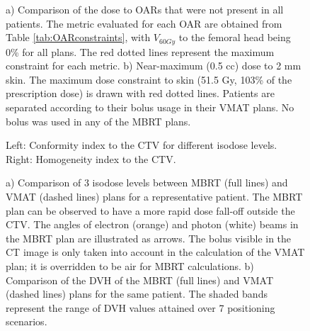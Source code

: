 \documentclass[aapm,graphicx,superscriptaddress]{revtex4-1}
\begin{document}
\begin{figure}[htb]
    \centering
    \subfloat[\label{fig:oar}]{
    
    }
    \subfloat[\label{fig:skin}]{
    
    }
    \caption{a) Comparison of the dose to OARs that were not present in all patients. The metric evaluated for each OAR are obtained from Table \ref{tab:OARconstraints}, with $V_{60Gy}$ to the femoral head being 0\% for all plans. The red dotted lines represent the maximum constraint for each metric. b) Near-maximum (0.5 cc) dose to 2 mm skin. The maximum dose constraint to skin (51.5 Gy, 103\% of the prescription dose) is drawn with red dotted lines. Patients are separated according to their bolus usage in their VMAT plans. No bolus was used in any of the MBRT plans.}
\end{figure}
\begin{figure}[htb]
    \centering
    
    \caption{Left: Conformity index to the CTV for different isodose levels. Right: Homogeneity index to the CTV.}
    \label{fig:ctv}
\end{figure}
\begin{figure}
    \centering
    \subfloat[\label{fig:dvh10}]{
    }
    \caption{a) Comparison of 3 isodose levels between MBRT (full lines) and VMAT (dashed lines) plans for a representative patient. The MBRT plan can be observed to have a more rapid dose fall-off outside the CTV. The angles of electron (orange) and photon (white) beams in the MBRT plan are illustrated as arrows. The bolus visible in the CT image is only taken into account in the calculation of the VMAT plan; it is overridden to be air for MBRT calculations. b) Comparison of the DVH of the MBRT (full lines) and VMAT (dashed lines) plans for the same patient. The shaded bands represent the range of DVH values attained over 7 positioning scenarios.}
    \label{fig:patient10}
\end{figure}
\end{document}
